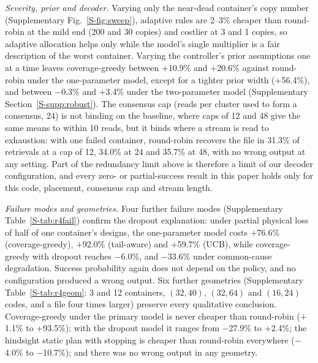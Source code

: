 \documentclass[conference,onecolumn,11pt]{IEEEtran}
\begin{document}
\emph{Severity, prior and decoder.}  Varying only the near-dead container's copy number
(Supplementary Fig.~\ref{S-fig:sweep}), adaptive rules are 2--3\% cheaper than round-robin at the mild end
(200 and 30 copies) and costlier at 3 and 1 copies, so adaptive allocation helps only while the model's
single multiplier is a fair description of the worst container.  Varying the controller's prior
assumptions one at a time leaves coverage-greedy between $+$10.9\% and $+$20.6\% against round-robin
under the one-parameter model, except for a tighter prior width ($+$56.4\%), and between $-$0.3\% and
$+$3.4\% under the two-parameter model (Supplementary Section~\ref{S-supp:robust}).  The consensus cap
(reads per cluster used to form a consensus, 24) is not binding on the baseline, where caps of 12 and 48
give the same means to within 10 reads, but it binds where a stream is read to exhaustion: with one
failed container, round-robin recovers the file in 31.3\% of retrievals at a cap of 12, 34.0\% at 24 and
35.7\% at 48, with no wrong output at any setting.  Part of the redundancy limit above is therefore a
limit of our decoder configuration, and every zero- or partial-success result in this paper holds only
for this code, placement, consensus cap and stream length.

\emph{Failure modes and geometries.}  Four further failure modes (Supplementary Table~\ref{S-tab:r4fail})
confirm the dropout explanation: under partial physical loss of half of one container's designs, the
one-parameter model costs $+$76.6\% (coverage-greedy), $+$92.0\% (tail-aware) and $+$59.7\% (UCB), while
coverage-greedy with dropout reaches $-$6.0\%, and $-$33.6\% under common-cause degradation.  Success
probability again does not depend on the policy, and no configuration produced a wrong output.  Six
further geometries (Supplementary Table~\ref{S-tab:r4geom}: 3 and 12 containers, $(32,40)$, $(32,64)$ and
$(16,24)$ codes, and a file four times larger) preserve every qualitative conclusion.  Coverage-greedy
under the primary model is never cheaper than round-robin ($+$1.1\% to $+$93.5\%); with the dropout model
it ranges from $-$27.9\% to $+$2.4\%; the hindsight static plan with stopping is cheaper than round-robin
everywhere ($-$4.0\% to $-$10.7\%); and there was no wrong output in any geometry.
\end{document}
